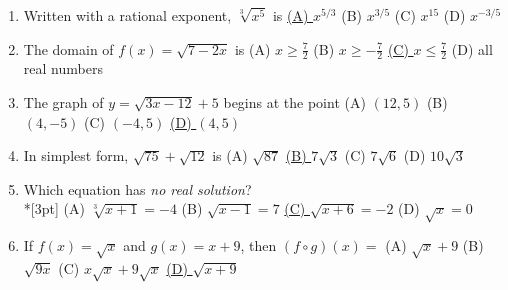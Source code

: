 \documentclass[10pt]{article}
\begin{document}
\begin{enumerate}[leftmargin=1.9em, itemsep=9pt]
  \item Written with a rational exponent, $\sqrt[3]{x^5}$ is\rlap{\hspace{4pt}\choicebox{\gradedblank[id=q9, type=choice, points=2, answer={A}]{0.3in}{10pt}}}
    \hfill \textcolor{keyred}{\underline{(A) $x^{5/3}$}} \quad (B) $x^{3/5}$ \quad (C) $x^{15}$ \quad (D) $x^{-3/5}$
  \item The domain of $f(x)=\sqrt{7-2x}$ is\rlap{\hspace{4pt}\choicebox{\gradedblank[id=q10, type=choice, points=2, answer={C}]{0.3in}{10pt}}}
    \hfill (A) $x\ge \frac72$ \quad (B) $x\ge -\frac72$ \quad \textcolor{keyred}{\underline{(C) $x\le \frac72$}} \quad (D) all real numbers
  \item The graph of $y=\sqrt{3x-12}+5$ begins at the point\rlap{\hspace{4pt}\choicebox{\gradedblank[id=q11, type=choice, points=2, answer={D}]{0.3in}{10pt}}}
    \hfill (A) $(12,5)$ \quad (B) $(4,-5)$ \quad (C) $(-4,5)$ \quad \textcolor{keyred}{\underline{(D) $(4,5)$}}
  \item In simplest form, $\sqrt{75}+\sqrt{12}$ is\rlap{\hspace{4pt}\choicebox{\gradedblank[id=q12, type=choice, points=2, answer={B}]{0.3in}{10pt}}}
    \hfill (A) $\sqrt{87}$ \quad \textcolor{keyred}{\underline{(B) $7\sqrt3$}} \quad (C) $7\sqrt6$ \quad (D) $10\sqrt3$
  \item {}Which equation has \emph{no real solution}?
    \\*[3pt]\hspace*{1.2em} (A) $\sqrt[3]{x+1}=-4$
    \hspace{1.0cm} (B) $\sqrt{x-1}=7$
    \hspace{1.0cm} \textcolor{keyred}{\underline{(C) $\sqrt{x+6}=-2$}}
    \hspace{1.0cm} (D) $\sqrt{x}=0$
  \item If $f(x)=\sqrt{x}$ and $g(x)=x+9$, then $(f\circ g)(x)=$\rlap{\hspace{3pt}\choicebox{\gradedblank[id=q14, type=choice, points=2, answer={D}]{0.26in}{10pt}}}
    \hfill (A) $\sqrt{x}+9$ \quad (B) $\sqrt{9x}$ \quad (C) $x\sqrt{x}+9\sqrt{x}$ \quad \textcolor{keyred}{\underline{(D) $\sqrt{x+9}$}}
\end{enumerate}
\end{document}
